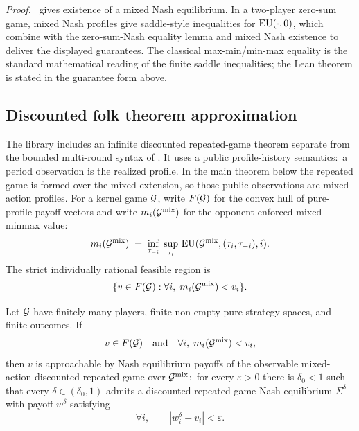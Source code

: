 \noindent\emph{Proof.}\  gives existence of a
mixed Nash equilibrium.  In a two-player zero-sum game, mixed Nash
profiles give saddle-style inequalities for $\mathrm{EU}(\cdot, 0)$,
which combine with the zero-sum-Nash equality lemma and mixed Nash
existence to deliver the displayed guarantees.  The classical
max-min/min-max equality is the standard mathematical reading of
the finite saddle inequalities; the Lean theorem is stated in the
guarantee form above.


\subsection{Discounted folk theorem approximation}
\label{sec:theorems:folk}

The library includes an infinite discounted repeated-game theorem
separate from the bounded multi-round syntax of
.  It uses a public profile-history
semantics:\ a period observation is the realized 
profile.  In the main theorem below the repeated game is formed over
the mixed extension, so those public observations are mixed-action
profiles.  For a kernel game $\mathcal{G}$, write
$F(\mathcal{G})$ for the convex hull of pure-profile payoff vectors and
write $m_i(\mathcal{G}^{\mathrm{mix}})$ for the opponent-enforced mixed
minmax value:
\[
  m_i(\mathcal{G}^{\mathrm{mix}})
    \;=\;
  \inf_{\tau_{-i}}\; \sup_{\tau_i}\,
    \mathrm{EU}(\mathcal{G}^{\mathrm{mix}},(\tau_i,\tau_{-i}),i).
\]
The strict individually rational feasible region is
\[
  \{v \in F(\mathcal{G}) : \forall i,\; m_i(\mathcal{G}^{\mathrm{mix}}) < v_i\}.
\]

\begin{theorem}
\label{thm:folk-discounted}
Let $\mathcal{G}$ have finitely many players, finite non-empty pure
strategy spaces, and finite outcomes.  If
\[
  v \in F(\mathcal{G})
  \quad\text{and}\quad
  \forall i,\; m_i(\mathcal{G}^{\mathrm{mix}}) < v_i,
\]
then $v$ is approachable by Nash equilibrium payoffs of the
observable mixed-action discounted repeated game over
$\mathcal{G}^{\mathrm{mix}}$:\ for every
$\varepsilon>0$ there is $\delta_0<1$ such that every
$\delta\in(\delta_0,1)$ admits a discounted repeated-game Nash
equilibrium $\Sigma^\delta$ with payoff $w^\delta$ satisfying
\[
  \forall i,\qquad |w^\delta_i - v_i| < \varepsilon.
\]
\end{theorem}

